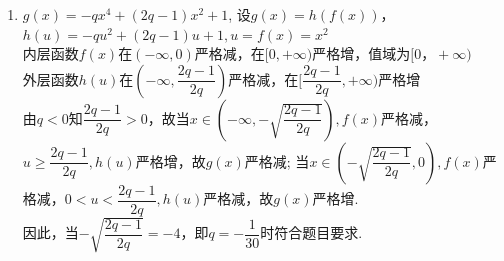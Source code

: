 \begin{enumerate}
\begin{jieda}
\begin{enumerate}[(1)]
\item $g(x)=-qx^4+(2q-1)x^2+1$, 设$g(x) = h(f(x))$，$h(u) = -qu^2 + (2q-1)u + 1, u = f(x) = x^2$ \\
内层函数$f(x)$在$(-\infty, 0)$严格减，在$[0, +\infty)$严格增，值域为$[0， +\infty)$ \\
外层函数$h(u)$在$(-\infty, \dfrac{2q-1}{2q})$严格减，在$[\dfrac{2q-1}{2q}, +\infty)$严格增 \\
由$q < 0$知$\dfrac{2q-1}{2q} > 0$，故当$x \in (-\infty, -\sqrt{\dfrac{2q-1}{2q}}), f(x)$严格减，$u \geq \dfrac{2q-1}{2q}, h(u)$严格增，故$g(x)$严格减; 当$x \in (-\sqrt{\dfrac{2q-1}{2q}}, 0), f(x)$严格减，$0 < u < \dfrac{2q-1}{2q}, h(u)$严格减，故$g(x)$严格增.\\
因此，当$-\sqrt{\dfrac{2q-1}{2q}} = -4$，即$q=-\dfrac{1}{30}$时符合题目要求. 
\end{enumerate}
\end{jieda}
\begin{vspace_}
\vsp[3]
\end{vspace_}
\end{enumerate}

